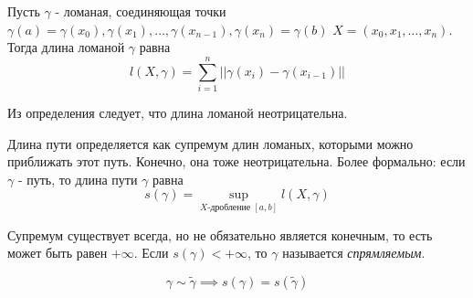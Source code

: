 \documentclass[../main.tex]{subfiles}
\begin{document}
Пусть \( \gamma \) - ломаная, соединяющая точки \( \gamma \left( a\right)= \gamma \left( x_0\right), \gamma \left( x_1\right), \dots,  \gamma \left( x_{n-1}\right), \gamma \left( x_n\right)= \gamma \left( b\right)\)
\(  X=\left( x_0,x_1, \dots,x_n\right)\). Тогда длина ломаной \( \gamma \) равна 
\[ l \left(X, \gamma \right) = \sum\limits_{ i=1}^{ n} \left| \left| \gamma \left( x_i\right)- \gamma \left( x_{i-1}\right)\right|\right|\] 

Из определения следует, что длина ломаной неотрицательна. 


Длина пути определяется как супремум длин ломаных, которыми можно приближать этот путь. Конечно, она тоже неотрицательна. Более формально: если \( \gamma \) - путь, то длина пути \( \gamma \) равна 
\[ s\left(\gamma \right)= \sup\limits_{ X\text{-дробление }\left[ a,b\right]} l \left( X, \gamma \right)\]

Супремум существует всегда, но не обязательно является конечным, то есть может быть равен \( + \infty \). Если \( s\left( \gamma \right)<+ \infty \), то \( \gamma \) называется \emph{спрямляемым}.  

\begin{thm}
    \[ \gamma \sim \tilde{ \gamma } \implies s\left( \gamma \right)=s\left( \tilde{ \gamma }\right)\]
\end{thm}
\end{document}
